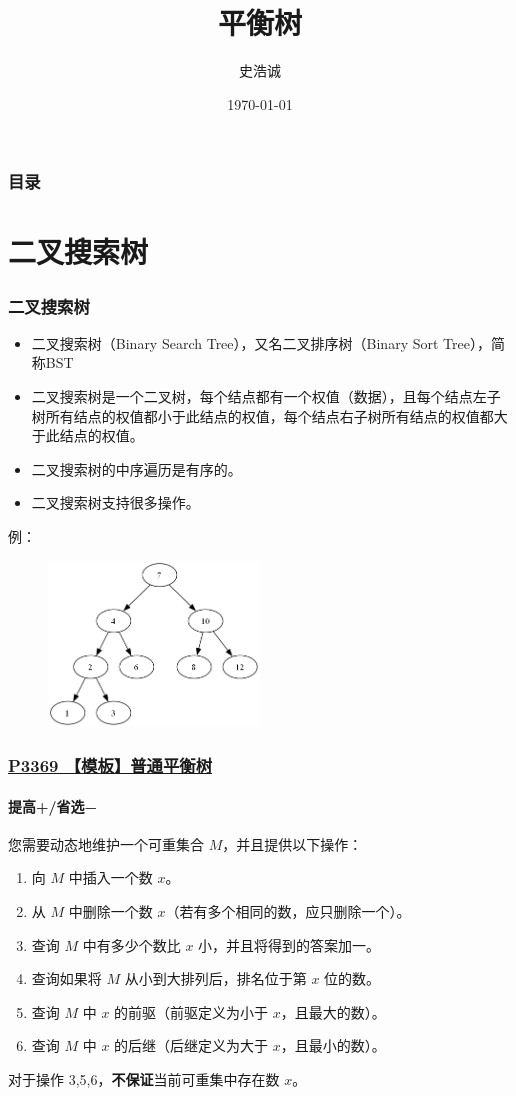 \documentclass[utf8]{ctexbeamer}
\title{平衡树}
\author{史浩诚}
\date{\today}
\begin{document}
	\frame{\titlepage}
	
    \begin{frame}
        \frametitle{目录}
        \tableofcontents 
    \end{frame}

    \section{二叉搜索树}

	\begin{frame}
		\frametitle{二叉搜索树}
        \begin{itemize}
            \item 二叉搜索树（Binary Search Tree），又名二叉排序树（Binary Sort Tree），简称BST
            \item 二叉搜索树是一个二叉树，每个结点都有一个权值（数据），且每个结点左子树所有结点的权值都小于此结点的权值，每个结点右子树所有结点的权值都大于此结点的权值。
            \item 二叉搜索树的中序遍历是有序的。
            \item 二叉搜索树支持很多操作。
        \end{itemize}
        例：
        \begin{figure}
            \centering
            \includegraphics[width=0.5\textwidth]{images/BST.png}
        \end{figure}

	\end{frame}

    \begin{frame}
        \frametitle{\href{https://www.luogu.com.cn/problem/P3369}{P3369 【模板】普通平衡树}}
        \framesubtitle{\textcolor[RGB]{52, 152, 219}{提高+/省选−}}
        您需要动态地维护一个可重集合 $M$，并且提供以下操作：
        \begin{enumerate}
            \item 向 $M$ 中插入一个数 $x$。
            \item 从 $M$ 中删除一个数 $x$（若有多个相同的数，应只删除一个）。
            \item 查询 $M$ 中有多少个数比 $x$ 小，并且将得到的答案加一。
            \item 查询如果将 $M$ 从小到大排列后，排名位于第 $x$ 位的数。
            \item 查询 $M$ 中 $x$ 的前驱（前驱定义为小于 $x$，且最大的数）。
            \item 查询 $M$ 中 $x$ 的后继（后继定义为大于 $x$，且最小的数）。
        \end{enumerate}
        对于操作 3,5,6，\textbf{不保证}当前可重集中存在数 $x$。
    \end{frame}
\end{document}
